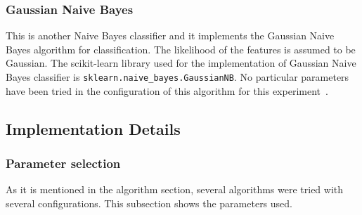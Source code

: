 \documentclass[letterpaper,10pt]{article}
\theoremstyle{mytheor}
\begin{document}
\subsubsection{Gaussian Naive Bayes}
This is another Naive Bayes classifier and it implements the Gaussian Naive Bayes algorithm for classification. The likelihood of the features is assumed to be Gaussian. The scikit-learn library used for the implementation of Gaussian Naive Bayes classifier is \lstinline|sklearn.naive_bayes.GaussianNB|. No particular parameters have been tried in the configuration of this algorithm for this experiment~\cite{scikit-learn}.

\subsection{Implementation Details}

\subsubsection{Parameter selection}
As it is mentioned in the algorithm section, several algorithms were tried with several configurations. This subsection shows the parameters used.
\end{document}
